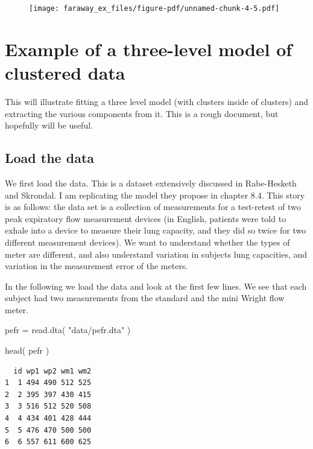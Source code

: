 \documentclass[
  letterpaper,
  DIV=11,
  numbers=noendperiod]{scrreprt}
\newenvironment{Shaded}{\begin{snugshade}}{\end{snugshade}}
\newcommand{\FunctionTok}[1]{\textcolor[rgb]{0.02,0.16,0.49}{#1}}
\newcommand{\NormalTok}[1]{\textcolor[rgb]{0.00,0.44,0.13}{#1}}
\newcommand{\OtherTok}[1]{\textcolor[rgb]{0.00,0.44,0.13}{#1}}
\newcommand{\StringTok}[1]{\textcolor[rgb]{0.25,0.44,0.63}{#1}}
\begin{document}
\begin{figure}[H]

{\centering \texttt{[image: faraway\_ex\_files/figure-pdf/unnamed-chunk-4-5.pdf]}

}

\end{figure}

\hypertarget{example-of-a-three-level-model-of-clustered-data}{%
\chapter{Example of a three-level model of clustered
data}\label{example-of-a-three-level-model-of-clustered-data}}

This will illustrate fitting a three level model (with clusters inside
of clusters) and extracting the various components from it. This is a
rough document, but hopefully will be useful.

\hypertarget{load-the-data}{%
\section{Load the data}\label{load-the-data}}

We first load the data. This is a dataset extensively discussed in
Rabe-Hesketh and Skrondal. I am replicating the model they propose in
chapter 8.4. This story is as follows: the data set is a collection of
measurements for a test-retest of two peak expiratory flow measurement
devices (in English, patients were told to exhale into a device to
measure their lung capacity, and they did so twice for two different
measurement devices). We want to understand whether the types of meter
are different, and also understand variation in subjects lung
capacities, and variation in the measurement error of the meters.

In the following we load the data and look at the first few lines. We
see that each subject had two measurements from the standard and the
mini Wright flow meter.

\begin{Shaded}
\begin{Highlighting}[]
\NormalTok{pefr }\OtherTok{=} \FunctionTok{read.dta}\NormalTok{( }\StringTok{"data/pefr.dta"}\NormalTok{ )}

\FunctionTok{head}\NormalTok{( pefr )}
\end{Highlighting}
\end{Shaded}

\begin{verbatim}
  id wp1 wp2 wm1 wm2
1  1 494 490 512 525
2  2 395 397 430 415
3  3 516 512 520 508
4  4 434 401 428 444
5  5 476 470 500 500
6  6 557 611 600 625
\end{verbatim}
\end{document}
